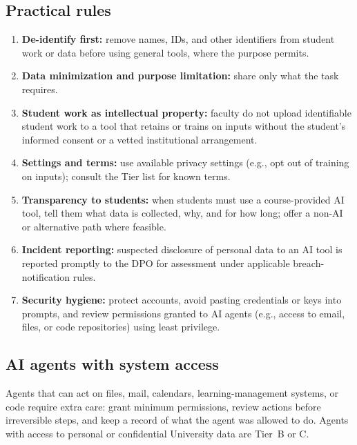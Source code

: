 \subsection{Practical rules}
\begin{enumerate}
  \item \textbf{De-identify first:} remove names, IDs, and other identifiers from student work or data before using general tools, where the purpose permits.
  \item \textbf{Data minimization and purpose limitation:} share only what the task requires.
  \item \textbf{Student work as intellectual property:} faculty do not upload identifiable student work to a tool that retains or trains on inputs without the student's informed consent or a vetted institutional arrangement.
  \item \textbf{Settings and terms:} use available privacy settings (e.g., opt out of training on inputs); consult the Tier list for known terms.
  \item \textbf{Transparency to students:} when students must use a course-provided AI tool, tell them what data is collected, why, and for how long; offer a non-AI or alternative path where feasible.
  \item \textbf{Incident reporting:} suspected disclosure of personal data to an AI tool is reported promptly to the DPO for assessment under applicable breach-notification rules.
  \item \textbf{Security hygiene:} protect accounts, avoid pasting credentials or keys into prompts, and review permissions granted to AI agents (e.g., access to email, files, or code repositories) using least privilege.
\end{enumerate}

\subsection{AI agents with system access}
Agents that can act on files, mail, calendars, learning-management systems, or code require extra care: grant minimum permissions, review actions before irreversible steps, and keep a record of what the agent was allowed to do. Agents with access to personal or confidential University data are Tier~B or C.
